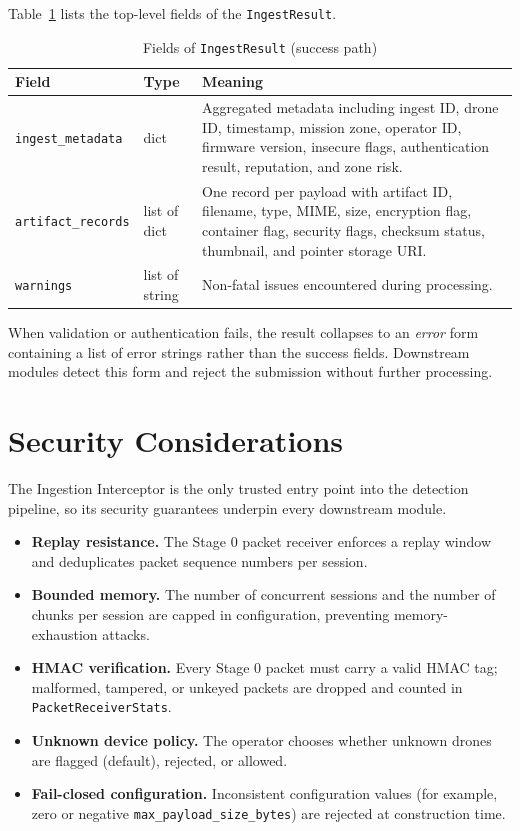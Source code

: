 \documentclass[12pt, a4paper]{report}
\begin{document}
Table~\ref{tab:ingest_result_fields} lists the top-level fields of the
\texttt{IngestResult}.

\begin{table}[H]
\centering
\caption{Fields of \texttt{IngestResult} (success path)}
\label{tab:ingest_result_fields}
\begin{tabular}{|l|l|p{6.5cm}|}
\hline
\textbf{Field} & \textbf{Type} & \textbf{Meaning} \\
\hline
\texttt{ingest\_metadata} & dict & Aggregated metadata including ingest ID, drone ID, timestamp, mission zone, operator ID, firmware version, insecure flags, authentication result, reputation, and zone risk. \\
\hline
\texttt{artifact\_records} & list of dict & One record per payload with artifact ID, filename, type, MIME, size, encryption flag, container flag, security flags, checksum status, thumbnail, and pointer storage URI. \\
\hline
\texttt{warnings} & list of string & Non-fatal issues encountered during processing. \\
\hline
\end{tabular}
\end{table}

When validation or authentication fails, the result collapses to an
\emph{error} form containing a list of error strings rather than the
success fields. Downstream modules detect this form and reject the
submission without further processing.

\section{Security Considerations}

The Ingestion Interceptor is the only trusted entry point into the
detection pipeline, so its security guarantees underpin every downstream
module.

\begin{itemize}
    \item \textbf{Replay resistance.} The Stage 0 packet receiver
          enforces a replay window and deduplicates packet sequence
          numbers per session.
    \item \textbf{Bounded memory.} The number of concurrent sessions
          and the number of chunks per session are capped in
          configuration, preventing memory-exhaustion attacks.
    \item \textbf{HMAC verification.} Every Stage 0 packet must carry
          a valid HMAC tag; malformed, tampered, or unkeyed packets are
          dropped and counted in \texttt{PacketReceiverStats}.
    \item \textbf{Unknown device policy.} The operator chooses whether
          unknown drones are flagged (default), rejected, or allowed.
    \item \textbf{Fail-closed configuration.} Inconsistent
          configuration values (for example, zero or negative
          \texttt{max\_payload\_size\_bytes}) are rejected at
          construction time.
\end{itemize}
\end{document}
